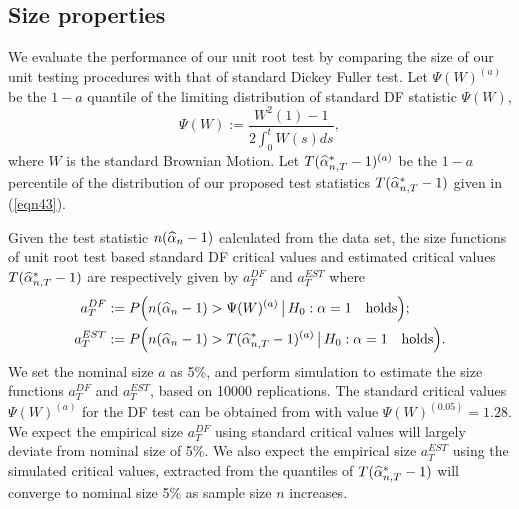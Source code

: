 \subsection{Size properties}
We evaluate the performance of our unit root test by comparing the size of our unit testing procedures with that of standard Dickey Fuller test. Let $\Psi(W)^{(a)}$ be the $1 - a$ quantile of the limiting distribution of standard DF statistic $\Psi(W)$,
\begin{equation}
\Psi(W) := \frac{W^2(1) - 1}{2 \int_{0}^t W(s) ds},
\end{equation}
where $W$ is the standard Brownian Motion. Let $T(\widehat{\alpha}_{n,T}^* - 1)^{(a)}$ be the $1 - a$ percentile of the distribution of our proposed test statistics $T(\widehat{\alpha}_{n,T}^* - 1)$ given in (\ref{eqn43}).

Given the test statistic $n( \widehat{\alpha}_n - 1)$ calculated from the data set, the size functions of unit root test based standard DF critical values and estimated critical values $T(\widehat{\alpha}_{n,T}^* - 1)$ are respectively given by $a_{T}^{DF}$ and $a_T^{EST}$ where
\begin{align}
a_T^{DF} & := P \Big ( n(\widehat{\alpha}_n - 1)  > \Psi(W)^{(a)}\, \big | \, H_0: \alpha = 1 \quad \mbox{holds} \Big ); \nonumber\\
a_T^{EST} & := P \Big ( n(\widehat{\alpha}_n - 1)  >  T(\widehat{\alpha}_{n,T}^* - 1)^{(a)} \, \big |\, H_0: \alpha = 1 \quad \mbox{holds} \Big ).
\end{align}
We set the nominal size $a$ as 5\%, and perform simulation to estimate the size functions $a_T^{DF}$ and $a_T^{EST}$, based on 10000 replications. The standard critical values $\Psi(W)^{(a)}$ for the DF test can be obtained from \cite{fuller1996} with value $\Psi(W)^{(0.05)} = 1.28$. We expect the empirical size $a_T^{DF}$ using standard critical values will largely deviate from nominal size of 5\%. We also expect the empirical size $a_T^{EST}$ using the simulated critical values, extracted from the quantiles of $T(\widehat{\alpha}_{n,T}^* - 1)$ will converge to nominal size 5\% as sample size $n$ increases.

